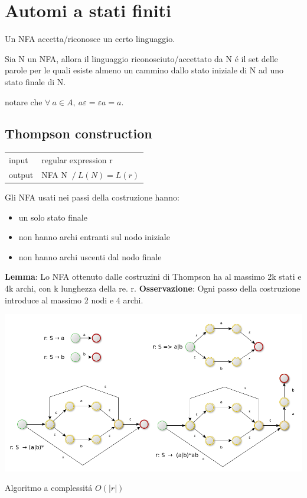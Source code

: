 \chapter{Automi a stati finiti}

Un NFA accetta/riconosce un certo linguaggio.

Sia N un NFA, allora il linguaggio riconosciuto/accettato da N \'e il set delle parole per le quali esiste almeno un cammino dallo stato iniziale di N ad uno stato finale di N.

notare che $\forall\ a \in A,\ a\varepsilon = \varepsilon a = a$.

\section{Thompson construction}
\begin{center}
    \begin{tabular}{ll}
        input & regular expression r\\
        output & NFA N $\ / \ L(N) = L(r)$\\ 
    \end{tabular}
\end{center}
Gli NFA usati nei passi della costruzione hanno:
\begin{itemize}
    \item un solo stato finale\\ 
    \item non hanno archi entranti sul nodo iniziale\\ 
    \item non hanno archi uscenti dal nodo finale\\
\end{itemize}

\textbf{Lemma}: Lo NFA ottenuto dalle costruzini di Thompson ha al massimo 2k stati e 4k archi, con k lunghezza della re. r.
\textbf{Osservazione}: Ogni passo della costruzione introduce al massimo 2 nodi e 4 archi.

\begin{center}
	\includegraphics[scale=0.45]{Chapters/Img/c02_01.png}\\
\end{center} 
Algoritmo a complessit\'a $O(|r|)$ 

